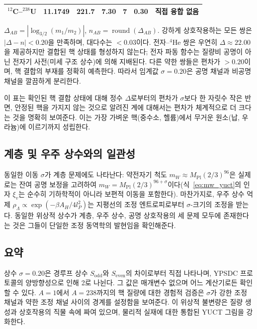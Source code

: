 \documentclass[11pt,a4paper]{article}
\theoremstyle{remark}
\begin{document}
\begin{table}[H]
\begin{tabular}{l c c c c c c}
			$^{12}$C--$^{238}$U& 11.1749& 221.7  & 7.30   & 7  & \textbf{0.30} & 직접 융합 없음 \\
			\bottomrule
		\end{tabular}
		\par\smallskip
		\footnotesize
		\(\Delta_{AB} = |\log_{3/2}(m_1/m_2)|\), \(n_{AB} = \operatorname{round}(\Delta_{AB})\). 강하게 상호작용하는 모든 쌍은 \(|\Delta-n| < 0.20\)을 만족하며, 대다수는 \(<0.03\)이다. 전자--$^4$He 쌍은 우연히 \(\Delta\approx22.00\)을 제공하지만 결합된 핵 상태를 형성하지 않는다; 전자 파동 함수는 질량비 공명이 아닌 전자기 사전(미세 구조 상수)에 의해 지배된다. 다른 약한 쌍들은 편차가 \(>0.20\)이며, 핵 결합의 부재를 정확히 예측한다. 따라서 임계값 \(\sigma = 0.20\)은 공명 채널과 비공명 채널을 깔끔하게 분리한다.
	\end{table}
	
	이 표는 확인된 핵 결합 상태에 대해 정수 \(\Delta\)로부터의 편차가 \(\sigma\)보다 한 자릿수 작은 반면, 안정된 핵을 가지지 않는 것으로 알려진 계에 대해서는 편차가 체계적으로 더 크다는 것을 명확히 보여준다. 이는 가장 가벼운 핵(중수소, 헬륨)에서 무거운 원소(납, 우라늄)에 이르기까지 성립한다.
	
	\subsection{계층 및 우주 상수와의 일관성}
	
	동일한 이동 \(\sigma\)가 계층 문제에도 나타난다: 약전자기 척도 \(m_W \approx M_{\mathrm{Pl}}(2/3)^{96}\)은 실제로는 잔여 공명 보정을 고려하여 \(m_W = M_{\mathrm{Pl}} (2/3)^{96+\sigma}\)이다(식~\ref{eq:mw_yuct}의 인자 \(\xi_v\)는 순수히 기하학적이 아니라 보편적 이동을 포함한다). 마찬가지로, 우주 상수 억제 \(\rho_\Lambda \propto \exp(-\beta A_H/4l_P^2)\)는 지평선의 조정 엔트로피로부터 \(\sigma\)-크기의 조정을 받는다. 동일한 위상적 상수가 계층, 우주 상수, 공명 상호작용의 세 문제 모두에 존재한다는 것은 그들이 단일한 조정 동역학의 발현임을 확인해준다.
	
	\subsection{요약}
	
	상수 \(\sigma = 0.20\)은 경루프 상수 \(S_{\mathrm{odd}}\)와 \(S_{\mathrm{even}}\)의 차이로부터 직접 나타나며, YPSDC 프로토콜의 양방향성으로 인해 2로 나뉜다. 그 값은 매개변수 없으며 어느 계산기로든 확인할 수 있다. \(A=1\)에서 \(A=238\)까지의 핵 질량에 대한 경험적 검증은 \(\sigma\)가 강한 조정 채널과 약한 조정 채널 사이의 경계를 설정함을 보여준다. 이 위상적 불변량은 질량 생성과 상호작용의 직물 속에 짜여 있으며, 물리적 실재에 대한 통합된 YUCT 그림을 강화한다.
	
\end{document}
